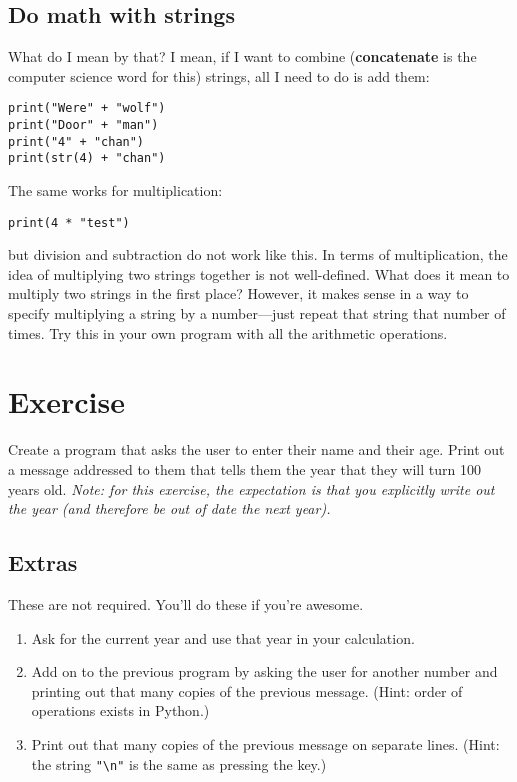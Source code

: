 \documentclass[a4paper]{article}
\begin{document}
\subsection{Do math with strings}
What do I mean by that? I mean, if I want to combine (\textbf{concatenate} is the computer science word for this) strings, all I need to do is add them:
\begin{verbatim}
print("Were" + "wolf") 
print("Door" + "man") 
print("4" + "chan") 
print(str(4) + "chan")
\end{verbatim}
The same works for multiplication:
\begin{verbatim}
print(4 * "test")
\end{verbatim}
but division and subtraction do not work like this.
In terms of multiplication, the idea of multiplying two strings together is not well-defined.
What does it mean to multiply two strings in the first place?
However, it makes sense in a way to specify multiplying a string by a number---just repeat that string that number of times.
Try this in your own program with all the arithmetic operations.
\section{Exercise}
Create a program that asks the user to enter their name and their age.
Print out a message addressed to them that tells them the year that they will turn 100 years old.
\textit{Note: for this exercise, the expectation is that you explicitly write out the year (and therefore be out of date the next year).}
\subsection{Extras}
These are not required.
You'll do these if you're awesome.
\begin{enumerate}
    \item Ask for the current year and use that year in your calculation.
    \item Add on to the previous program by asking the user for another number and printing out that many copies of the previous message. (Hint: order of operations exists in Python.)
    \item Print out that many copies of the previous message on separate lines. (Hint: the string \verb|"\n"| is the same as pressing the \keys{\return{}} key.)
\end{enumerate}
\end{document}
